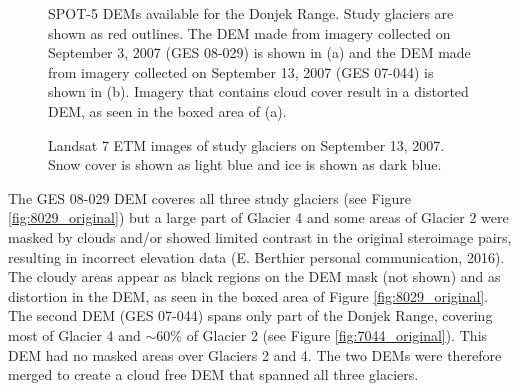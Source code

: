 \documentclass{sfuthesis}
\begin{document}
\begin{figure}[H]
    \caption{SPOT-5 DEMs available for the Donjek Range. Study glaciers are shown as red outlines. The DEM made from imagery collected on September 3, 2007 (GES 08-029) is shown in (a) and the DEM made from imagery collected on September 13, 2007 (GES 07-044) is shown in (b). Imagery that contains cloud cover result in a distorted DEM, as seen in the boxed area of (a).}
    \label{fig:originalDEMs}
\end{figure}

\begin{figure}[H]
	\caption{Landsat 7 ETM images of study glaciers on September 13, 2007. Snow cover is shown as light blue and ice is shown as dark blue.}
	\label{fig:Landsat_2007}
\end{figure}

The GES 08-029 DEM coveres all three study glaciers (see Figure \ref{fig:8029_original}) but a large part of Glacier 4 and some areas of Glacier 2 were masked by clouds and/or showed limited contrast in the original steroimage pairs, resulting in incorrect elevation data (E. Berthier personal communication, 2016). The cloudy areas appear as black regions on the DEM mask (not shown) and as distortion in the DEM, as seen in the boxed area of Figure \ref{fig:8029_original}. The second DEM (GES 07-044) spans only part of the Donjek Range, covering most of Glacier 4 and $\sim$60\% of Glacier 2 (see Figure \ref{fig:7044_original}). This DEM had no masked areas over Glaciers 2 and 4. The two DEMs were therefore merged to create a cloud free DEM that spanned all three glaciers. 
\end{document}
